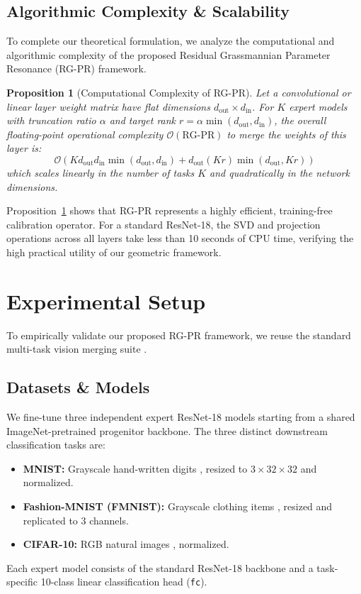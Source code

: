 \documentclass{article}
\theoremstyle{plain}
\newtheorem{proposition}[theorem]{Proposition}
\theoremstyle{definition}
\theoremstyle{remark}
\begin{document}
\subsection{Algorithmic Complexity \& Scalability}
To complete our theoretical formulation, we analyze the computational and algorithmic complexity of the proposed Residual Grassmannian Parameter Resonance (RG-PR) framework.

\begin{proposition}[Computational Complexity of RG-PR]
\label{prop:complexity}
Let a convolutional or linear layer weight matrix have flat dimensions $d_{\text{out}} \times d_{\text{in}}$. For $K$ expert models with truncation ratio $\alpha$ and target rank $r = \alpha \min(d_{\text{out}}, d_{\text{in}})$, the overall floating-point operational complexity $\mathcal{O}(\text{RG-PR})$ to merge the weights of this layer is:
\begin{equation}
    \mathcal{O}\left( K d_{\text{out}} d_{\text{in}} \min(d_{\text{out}}, d_{\text{in}}) + d_{\text{out}} (Kr) \min(d_{\text{out}}, Kr) \right)
\end{equation}
which scales linearly in the number of tasks $K$ and quadratically in the network dimensions.
\end{proposition}

Proposition~\ref{prop:complexity} shows that RG-PR represents a highly efficient, training-free calibration operator. For a standard ResNet-18, the SVD and projection operations across all layers take less than 10 seconds of CPU time, verifying the high practical utility of our geometric framework.

\section{Experimental Setup}
\label{sec:experiments}

To empirically validate our proposed RG-PR framework, we reuse the standard multi-task vision merging suite \citep{anonymous2026isotropic}.

\subsection{Datasets \& Models}
We fine-tune three independent expert ResNet-18 models starting from a shared ImageNet-pretrained progenitor backbone. The three distinct downstream classification tasks are:
\begin{itemize}
    \item \textbf{MNIST:} Grayscale hand-written digits \citep{lecun1998gradient}, resized to $3 \times 32 \times 32$ and normalized.
    \item \textbf{Fashion-MNIST (FMNIST):} Grayscale clothing items \citep{xiao2017fashion}, resized and replicated to 3 channels.
    \item \textbf{CIFAR-10:} RGB natural images \citep{krizhevsky2009learning}, normalized.
\end{itemize}
Each expert model consists of the standard ResNet-18 backbone and a task-specific 10-class linear classification head (\texttt{fc}).
\end{document}
